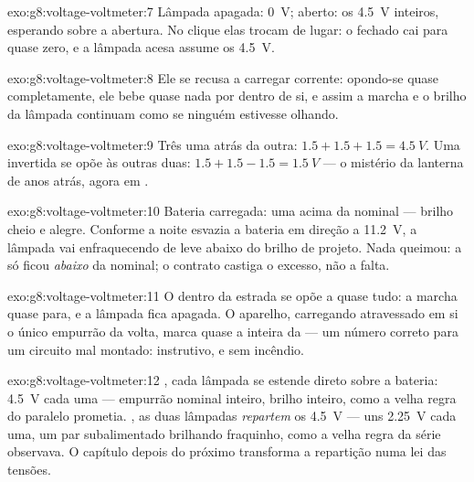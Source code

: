 \begin{solution}{exo:g8:voltage-voltmeter:7}
Lâmpada apagada: \qty{0}{V};  aberto: os \qty{4.5}{V}
inteiros, esperando sobre a abertura. No clique elas trocam de lugar:
o  fechado cai para quase zero, e a lâmpada acesa assume
os \qty{4.5}{V}.
\end{solution}

\begin{solution}{exo:g8:voltage-voltmeter:8}
Ele se recusa a carregar corrente: opondo-se quase completamente, ele
bebe quase nada por dentro de si, e assim a marcha e o brilho da
lâmpada continuam como se ninguém estivesse olhando.
\end{solution}

\begin{solution}{exo:g8:voltage-voltmeter:9}
Três  uma atrás da outra: $1.5 + 1.5 + 1.5 = \qty{4.5}{V}$. Uma
invertida se opõe às outras duas:
$1.5 + 1.5 - 1.5 = \qty{1.5}{V}$ --- o mistério da lanterna de anos
atrás, agora em .
\end{solution}

\begin{solution}{exo:g8:voltage-voltmeter:10}
Bateria carregada: uma  acima da nominal --- brilho cheio e
alegre. Conforme a noite esvazia a bateria em direção a \qty{11.2}{V},
a lâmpada vai enfraquecendo de leve abaixo do brilho de projeto. Nada
queimou: a  só ficou \emph{abaixo} da nominal; o contrato
castiga o excesso, não a falta.
\end{solution}

\begin{solution}{exo:g8:voltage-voltmeter:11}
O  dentro da estrada se opõe a quase tudo: a marcha quase
para, e a lâmpada fica apagada. O aparelho, carregando atravessado em
si o único empurrão da volta, marca quase a  inteira da 
--- um número correto para um circuito mal montado: instrutivo, e sem
incêndio.
\end{solution}

\begin{solution}{exo:g8:voltage-voltmeter:12}
, cada lâmpada se estende direto sobre a bateria:
\qty{4.5}{V} cada uma --- empurrão nominal inteiro, brilho inteiro,
como a velha regra do paralelo prometia. , as duas lâmpadas
\emph{repartem} os \qty{4.5}{V} --- uns \qty{2.25}{V} cada uma, um par
subalimentado brilhando fraquinho, como a velha regra da série
observava. O capítulo depois do próximo transforma a repartição numa
lei das tensões.
\end{solution}

